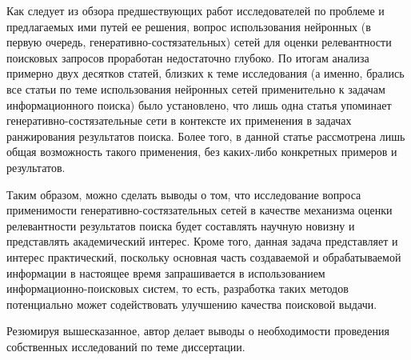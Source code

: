 Как следует из обзора предшествующих работ исследователей по проблеме
и предлагаемых ими путей ее решения, вопрос использования нейронных (в первую очередь,
генеративно-состязательных) сетей для оценки релевантности поисковых запросов проработан
недостаточно глубоко. По итогам анализа примерно двух десятков статей, близких к
теме исследования (а именно, брались все статьи по теме использования нейронных сетей
применительно к задачам информационного поиска) было установлено, что лишь одна статья
упоминает генеративно-состязательные сети в контексте их применения в задачах ранжирования
результатов поиска. Более того, в данной статье рассмотрена лишь общая возможность такого
применения, без каких-либо конкретных примеров и результатов.

Таким образом, можно сделать выводы о том, что исследование вопроса применимости генеративно-состязательных
сетей в качестве механизма оценки релевантности результатов поиска будет составлять научную новизну
и представлять академический интерес. Кроме того, данная задача представляет и интерес практический,
поскольку основная часть создаваемой и обрабатываемой информации в настоящее время запрашивается
в использованием информационно-поисковых систем, то есть, разработка таких методов потенциально
может содействовать улучшению качества поисковой выдачи.

Резюмируя вышесказанное, автор делает выводы о необходимости проведения собственных исследований
по теме диссертации.